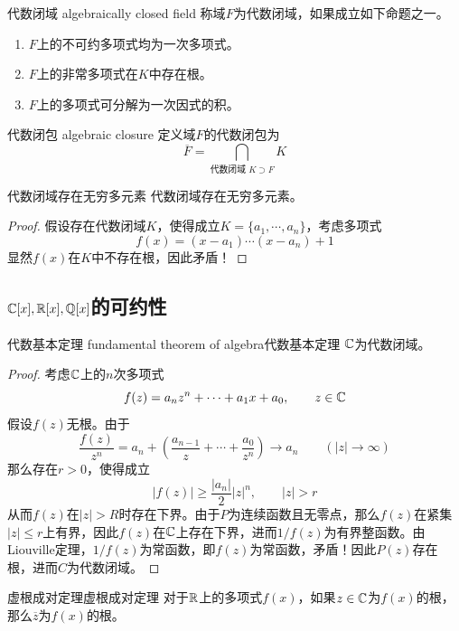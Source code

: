 \begin{definition}{代数闭域 algebraically closed field}
	称域$F$为代数闭域，如果成立如下命题之一。
	\begin{enumerate}
		\item $F$上的不可约多项式均为一次多项式。
		\item $F$上的非常多项式在$K$中存在根。
		\item $F$上的多项式可分解为一次因式的积。
	\end{enumerate}
\end{definition}

\begin{definition}{代数闭包 algebraic closure}
	定义域$F$的代数闭包为
	$$
	\overline{F}=\bigcap_{\text{代数闭域 }K\supset F}K
	$$
\end{definition}

\begin{proposition}{}{代数闭域存在无穷多元素}
	代数闭域存在无穷多元素。
\end{proposition}

\begin{proof}
	假设存在代数闭域$K$，使得成立$K=\{ a_1,\cdots,a_n \}$，考虑多项式%
	$$
	f(x)=(x-a_1)\cdots(x-a_n)+1
	$$
	显然$f(x)$在$K$中不存在根，因此矛盾！
\end{proof}

\subsection{$\mathbb{C}[x],\mathbb{R}[x],\mathbb{Q}[x]$的可约性}

\begin{theorem}{代数基本定理 fundamental theorem of algebra}{代数基本定理}
	$\mathbb{C}$为代数闭域。
\end{theorem}

\begin{proof}
	考虑$\mathbb{C}$上的$n$次多项式
	$$
	f(z)=a_nz^n+\cdots +a_1x+a_0,\qquad 
	z\in\mathbb{C}
	$$
	假设$f(z)$无根。由于
	$$
	\frac{f(z)}{z^n}=a_n+\left(\frac{a_{n-1}}{z}+\cdots+\frac{a_0}{z^n}\right)\to a_n
	\qquad (|z|\to\infty)
	$$
	那么存在$r>0$，使得成立
	$$
	|f(z)|\ge\frac{|a_n|}{2}|z|^n,\qquad |z|>r
	$$
	从而$f(z)$在$|z|>R$时存在下界。由于$P$为连续函数且无零点，那么$f(z)$在紧集$|z|\le r$上有界，因此$f(z)$在$\mathbb{C}$上存在下界，进而$1/f(z)$为有界整函数。由Liouville定理，$1/f(z)$为常函数，即$f(z)$为常函数，矛盾！因此$P(z)$存在根，进而$C$为代数闭域。
\end{proof}

\begin{proposition}{虚根成对定理}{虚根成对定理}
	对于$\mathbb{R}$上的多项式$f(x)$，如果$z\in\mathbb{C}$为$f(x)$的根，那么$\overline{z}$为$f(x)$的根。
\end{proposition}

